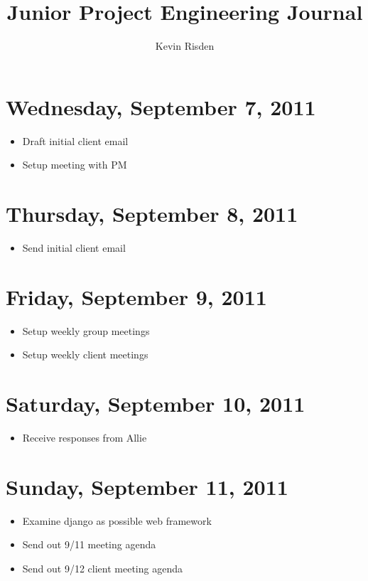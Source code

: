 \documentclass{article}
\title{Junior Project Engineering Journal}
\author{Kevin Risden}
\begin{document}
\maketitle

\section{Wednesday, September 7, 2011}
\begin{itemize}
\item Draft initial client email
\item Setup meeting with PM
\end{itemize}

\section{Thursday, September 8, 2011}
\begin{itemize}
\item Send initial client email
\end{itemize}

\section{Friday, September 9, 2011}
\begin{itemize}
\item Setup weekly group meetings
\item Setup weekly client meetings
\end{itemize}

\section{Saturday, September 10, 2011}
\begin{itemize}
\item Receive responses from Allie
\end{itemize}

\section{Sunday, September 11, 2011}
\begin{itemize}
\item Examine django as possible web framework
\item Send out 9/11 meeting agenda
\item Send out 9/12 client meeting agenda
\end{itemize}
\end{document}
